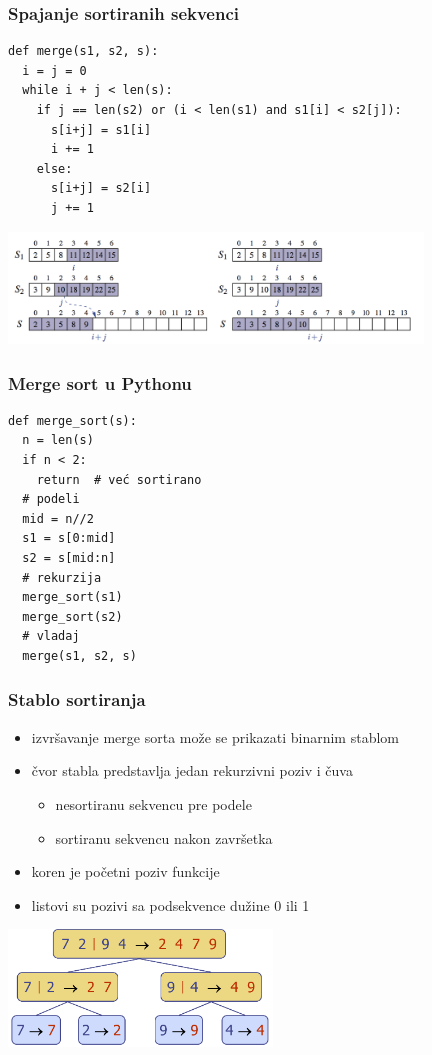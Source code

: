 \documentclass[compress,aspectratio=169]{beamer}
\begin{document}
\begin{frame}
  \frametitle{Spajanje sortiranih sekvenci}
\begin{verbatim}
def merge(s1, s2, s):
  i = j = 0
  while i + j < len(s):
    if j == len(s2) or (i < len(s1) and s1[i] < s2[j]):
      s[i+j] = s1[i]
      i += 1
    else:
      s[i+j] = s2[i]
      j += 1
\end{verbatim}
\includegraphics[width=11cm]{asp-12-pic01.png}
\end{frame}

\begin{frame}
  \frametitle{Merge sort u Pythonu}
\begin{verbatim}
def merge_sort(s):
  n = len(s)
  if n < 2:
    return  # već sortirano
  # podeli
  mid = n//2
  s1 = s[0:mid]
  s2 = s[mid:n]
  # rekurzija
  merge_sort(s1)
  merge_sort(s2)
  # vladaj
  merge(s1, s2, s)
\end{verbatim}
\end{frame}

\begin{frame}[fragile]
  \frametitle{Stablo sortiranja}
  \begin{itemize}
    \item izvršavanje merge sorta može se prikazati binarnim stablom
    \item čvor stabla predstavlja jedan rekurzivni poziv i čuva
    \begin{itemize}
      \item nesortiranu sekvencu pre podele
      \item sortiranu sekvencu nakon završetka
    \end{itemize}
    \item koren je početni poziv funkcije
    \item listovi su pozivi sa podsekvence dužine 0 ili 1
  \end{itemize}
  \begin{center}
    \includegraphics[width=7cm]{asp-12-pic02.png}
  \end{center}
\end{frame}
  
\end{document}
